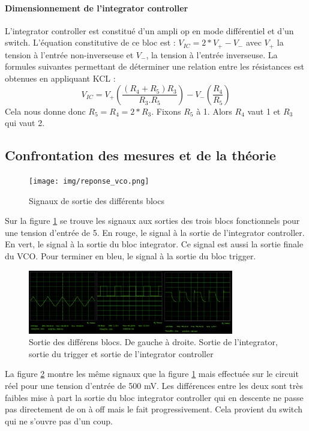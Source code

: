 \paragraph{Dimensionnement de l'integrator controller}
L'integrator controller est constitué d'un ampli op en mode différentiel et d'un switch. L'équation constitutive de ce bloc est : $V_{IC}=2*V_+ - V_-$ avec $V_+$ la tension à l'entrée non-inverseuse et $V_-$, la tension à l'entrée inverseuse. La formules suivantes permettant de déterminer une relation entre les résistances est obtenues en appliquant KCL : $$V_{IC}=V_+ \left(\frac{\left(R_4 + R_5\right)R_3}{R_3.R_5}\right)-V_-\left(\frac{R_4}{R_5}\right)$$ Cela nous donne donc $R_5 = R_4 = 2*R_3$.
Fixons $R_5$ à \unit{1}{\kilo\ohm}. Alors $R_4$ vaut \unit{1}{\kilo\ohm} et $R_3$ qui vaut \unit{2}{\kilo\ohm}.

\subsection{Confrontation  des mesures et de la théorie}
\begin{figure}[ht]
	\centering
	\texttt{[image: img/reponse\_vco.png]}
	\caption{Signaux de sortie des différents blocs}
	\label{fig:out_vco_th}
\end{figure}
Sur la figure \ref{fig:out_vco_th} se trouve les signaux aux sorties des trois blocs fonctionnels pour une tension d'entrée de \unit{5}{\volt}. En rouge, le signal à la sortie de l'integrator controller. En vert, le signal à la sortie du bloc integrator. Ce signal est aussi la sortie finale du VCO. Pour terminer en bleu, le signal à la sortie du bloc trigger.
\begin{figure}[ht]                                       
	\centering
	\includegraphics[width=0.8\textwidth]{img/vco_real_out.png}
	\caption{Sortie des différens blocs. De gauche à droite. Sortie de l'integrator, sortie du trigger et sortie de l'integrator controller}
	\label{fig:out_vco_real}
\end{figure}
La figure \ref{fig:out_vco_real} montre les même signaux que la figure \ref{fig:out_vco_th} mais effectuée sur le circuit réel pour une tension d'entrée de 500 mV. Les différences entre les deux sont très faibles mise à part la sortie du bloc integrator controller qui en descente ne passe pas directement de on à off mais le fait progressivement. Cela provient du switch qui ne s'ouvre pas d'un coup.

